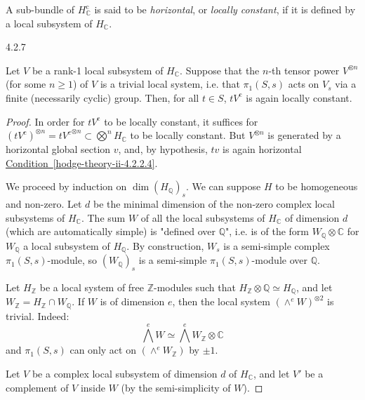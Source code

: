   A sub-bundle of \(H_\mathbb {C}^\mathrm {c}\) is said to be \emph{horizontal}, or \emph{locally constant}, if it is defined by a local subsystem of \(H_\mathbb {C}\).\begin{lemma}{4.2.7}\label{hodge-theory-ii-4.2.7}\skipsinglepar\par{}Let \(V\) be a rank-1 local subsystem of \(H_\mathbb {C}\).
    Suppose that the \(n\)-th tensor power \(V^{\otimes  n}\) (for some \(n\geqslant 1\)) of \(V\) is a trivial local system, i.e. that \(\pi _1(S,s)\) acts on \(V_s\) via a finite (necessarily cyclic) group.
    Then, for all \(t\in  S\), \(tV^\mathrm {c}\) is again locally constant.\begin{proof}\par{}In order for \(tV^\mathrm {c}\) to be locally constant, it suffices for \((tV^\mathrm {c})^{\otimes  n}={tV^{c}}^{\otimes  n}\subset \bigotimes ^n H_\mathbb {C}\) to be locally constant.
      But \(V^{\otimes  n}\) is generated by a horizontal global section \(v\), and, by hypothesis, \(tv\) is again horizontal \hyperref[hodge-theory-ii-4.2.2.4]{Condition~\ref*{hodge-theory-ii-4.2.2.4}}.\par{}We proceed by induction on \(\dim (H_\mathbb {Q})_s\).
      We can suppose \(H\) to be homogeneous and non-zero.
      Let \(d\) be the minimal dimension of the non-zero complex local subsystems of \(H_\mathbb {C}\).
      The sum \(W\) of all the local subsystems of \(H_\mathbb {C}\) of dimension \(d\) (which are automatically simple) is "defined over \(\mathbb {Q}\)", i.e. is of the form \(W_\mathbb {Q}\otimes \mathbb {C}\) for \(W_\mathbb {Q}\) a local subsystem of \(H_\mathbb {Q}\).
      By construction, \(W_s\) is a semi-simple complex \(\pi _1(S,s)\)-module, so \((W_\mathbb {Q})_s\) is a semi-simple \(\pi _1(S,s)\)-module over \(\mathbb {Q}\).\par{}Let \(H_\mathbb {Z}\) be a local system of free \(\mathbb {Z}\)-modules such that \(H_\mathbb {Z}\otimes \mathbb {Q}\simeq  H_\mathbb {Q}\), and let \(W_\mathbb {Z}=H_\mathbb {Z}\cap  W_\mathbb {Q}\).
      If \(W\) is of dimension \(e\), then the local system \((\wedge ^e W)^{\otimes 2}\) is trivial.
      Indeed:
      \[         \bigwedge ^e W         \simeq  \bigwedge ^e W_\mathbb {Z}\otimes \mathbb {C}       \]
      and \(\pi _1(S,s)\) can only act on \((\wedge ^e W_\mathbb {Z})\) by \(\pm 1\).\par{}Let \(V\) be a complex local subsystem of dimension \(d\) of \(H_\mathbb {C}\), and let \(V'\) be a complement of \(V\) inside \(W\) (by the semi-simplicity of \(W\)).

\end{proof}
\end{lemma}
